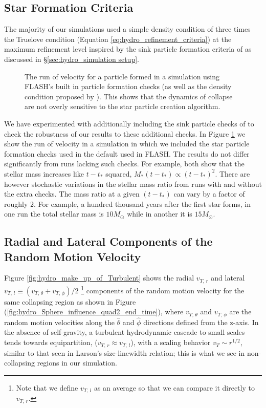 \documentclass[../dissertation.tex]{subfiles}
\begin{document}
\subsection{Star Formation Criteria}
\label{particle_criteria}
The majority of our simulations used a simple density condition of three times the Truelove condition (Equation \ref{eq:hydro_refinement_criteria}) at the maximum refinement level inspired by the sink particle formation criteria of \citet{2011ApJ...730...40P} as discussed in \S \ref{sec:hydro_simulation setup}.
%
%
\begin{figure}[htb]%
\caption[Hydro comparison to particle formation checks]{The run of velocity for a particle formed in a simulation using FLASH's built in particle formation checks (as well as the density condition proposed by \citet{2011ApJ...730...40P}). 
This shows that the dynamics of collapse are not overly sensitive to the star particle creation algorithm. \label{fig:hydro_federrath_particle}}
\end{figure}
%
We have experimented with additionally including the sink particle checks of \citet{2010ApJ...713..269F} to check the robustness of our results to these additional checks. In Figure \ref{fig:hydro_federrath_particle} we show the run of velocity in a simulation in which we included the star particle formation checks used in the default used in FLASH. The results do not differ significantly from runs lacking such checks. For example, both show that the stellar mass increases like $t-t_*$ squared, $M_*(t-t_*) \propto (t-t_*)^2$. There are however stochastic variations in the stellar mass ratio from runs with and without the extra checks. The mass ratio at a given $(t-t_*)$ can vary by a factor of roughly 2. For example, a hundred thousand years after the first star forms, in one run the total stellar mass is $10 M_\odot$ while in another it is $15 M_\odot$.
%



\subsection{Radial and Lateral Components of the Random Motion
  Velocity}\label{sec:hydro_turbulent components}
Figure \ref{fig:hydro_make_up_of_Turbulent} shows the radial 
$v_{T,\,r}$ and lateral 
$v_{T,\,l}\equiv (v_{T,\,\theta}+v_{T,\,\phi})/2$ \footnote{Note that we define $v_{T,\,l}$ as an average so that we can compare it directly to $v_{T,\,r}$.}
components of the random motion velocity for the same collapsing region as 
shown in Figure (\ref{fig:hydro_Sphere_influence_quad2_end_time}), where 
$v_{T,\,\theta}$ and $v_{T,\,\phi}$ are the random motion velocities 
along the $\hat{\theta}$ and $\hat{\phi}$ directions defined 
from the z-axis. In the absence of self-gravity,
a turbulent hydrodynamic cascade to small scales tends towards
equipartition, ($v_{T,\,r}\approx v_{T,\,l}$), with a scaling behavior
$v_T\sim r^{1/2}$, similar to that seen in Larson's size-linewidth relation; this is
what we see in non-collapsing regions in our simulation. 
\end{document}
